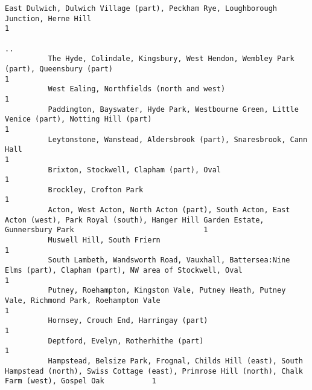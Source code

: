 \documentclass[11pt]{article}
\begin{document}
\begin{Verbatim}[commandchars=\\\{\}]
          East Dulwich, Dulwich Village (part), Peckham Rye, Loughborough Junction, Herne Hill                                                                                1
                                                                                                                                                                             ..
          The Hyde, Colindale, Kingsbury, West Hendon, Wembley Park (part), Queensbury (part)                                                                                 1
          West Ealing, Northfields (north and west)                                                                                                                           1
          Paddington, Bayswater, Hyde Park, Westbourne Green, Little Venice (part), Notting Hill (part)                                                                       1
          Leytonstone, Wanstead, Aldersbrook (part), Snaresbrook, Cann Hall                                                                                                   1
          Brixton, Stockwell, Clapham (part), Oval                                                                                                                            1
          Brockley, Crofton Park                                                                                                                                              1
          Acton, West Acton, North Acton (part), South Acton, East Acton (west), Park Royal (south), Hanger Hill Garden Estate, Gunnersbury Park                              1
          Muswell Hill, South Friern                                                                                                                                          1
          South Lambeth, Wandsworth Road, Vauxhall, Battersea:Nine Elms (part), Clapham (part), NW area of Stockwell, Oval                                                    1
          Putney, Roehampton, Kingston Vale, Putney Heath, Putney Vale, Richmond Park, Roehampton Vale                                                                        1
          Hornsey, Crouch End, Harringay (part)                                                                                                                               1
          Deptford, Evelyn, Rotherhithe (part)                                                                                                                                1
          Hampstead, Belsize Park, Frognal, Childs Hill (east), South Hampstead (north), Swiss Cottage (east), Primrose Hill (north), Chalk Farm (west), Gospel Oak           1

\end{Verbatim}
\end{document}
